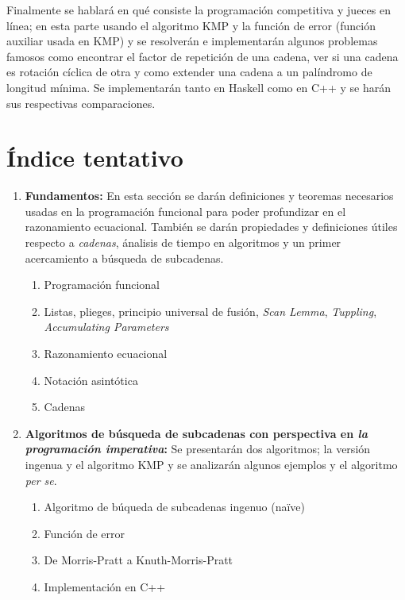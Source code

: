 \documentclass[letterpaper,11pt]{article}
\begin{document}
Finalmente se hablará en qué consiste la programación competitiva y jueces en línea; en esta parte
usando el algoritmo KMP y la función de error (función auxiliar usada en KMP) y se resolverán e
implementarán algunos problemas famosos como encontrar el factor de repetición de una cadena,
ver si una cadena es rotación cíclica de otra y como extender una cadena a un palíndromo de
longitud mínima. Se implementarán tanto en Haskell como en C++ y se harán sus respectivas
comparaciones.

\section{Índice tentativo}

\begin{enumerate}

\item \textbf{Fundamentos:} En esta sección se darán definiciones y teoremas necesarios usadas en
la programación funcional para poder profundizar en el razonamiento ecuacional. También se darán
propiedades y definiciones útiles respecto a \textit{cadenas}, ánalisis de tiempo en algoritmos y
un primer acercamiento a búsqueda de subcadenas.
\begin{enumerate}
    \item Programación funcional
    \item Listas, plieges, principio universal de fusión, \textit{Scan Lemma}, \textit{Tuppling},
    \textit{Accumulating Parameters}
    \item Razonamiento ecuacional
    \item Notación asintótica
    \item Cadenas
\end{enumerate}

\item \textbf{Algoritmos de búsqueda de subcadenas con perspectiva en \textit{la programación
imperativa}:} Se presentarán dos algoritmos; la versión ingenua y el algoritmo KMP y se analizarán
algunos ejemplos y el algoritmo \textit{per se}.
\begin{enumerate}
    \item Algoritmo de búqueda de subcadenas ingenuo (naïve)
    \item Función de error
    \item De Morris-Pratt a Knuth-Morris-Pratt
    \item Implementación en C++
\end{enumerate}


\end{enumerate}
\end{document}

